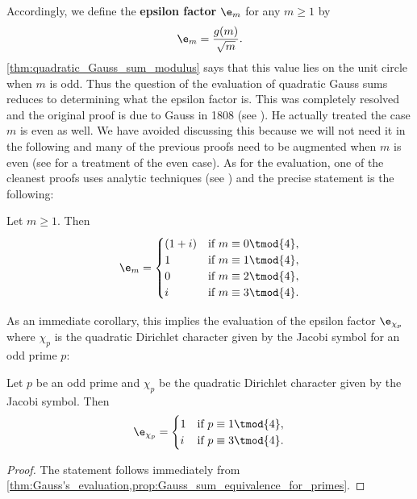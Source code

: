       Accordingly, we define the \textbf{epsilon factor} $\e_{m}$ for any $m \ge 1$ by
      \[
        \e_{m} = \frac{g(m)}{\sqrt{m}}.
      \]
      \cref{thm:quadratic_Gauss_sum_modulus} says that this value lies on the unit circle when $m$ is odd. Thus the question of the evaluation of quadratic Gauss sums reduces to determining what the epsilon factor is. This was completely resolved and the original proof is due to Gauss in 1808 (see \cite{Gauss1808summatio}). He actually treated the case $m$ is even as well. We have avoided discussing this because we will not need it in the following and many of the previous proofs need to be augmented when $m$ is even (see \cite{lang1994algebraic} for a treatment of the even case). As for the evaluation, one of the cleanest proofs uses analytic techniques (see \cite{lang1994algebraic}) and the precise statement is the following:

      \begin{theorem}\label{thm:Gauss's_evaluation}
        Let $m \ge 1$. Then
        \[
          \e_{m} = \begin{cases} (1+i) & \text{if $m \equiv 0 \tmod{4}$}, \\ 1 & \text{if $m \equiv 1 \tmod{4}$}, \\ 0 & \text{if $m \equiv 2 \tmod{4}$}, \\ i & \text{if $m \equiv 3 \tmod{4}$}. \end{cases}
        \]
      \end{theorem}

      As an immediate corollary, this implies the evaluation of the epsilon factor $\e_{\chi_{p}}$ where $\chi_{p}$ is the quadratic Dirichlet character given by the Jacobi symbol for an odd prime $p$:

      \begin{corollary}
        Let $p$ be an odd prime and $\chi_{p}$ be the quadratic Dirichlet character given by the Jacobi symbol. Then
        \[
          \e_{\chi_{p}} = \begin{cases} 1 & \text{if $p \equiv 1 \tmod{4}$}, \\ i & \text{if $p \equiv 3 \tmod{4}$}. \end{cases}
        \]
      \end{corollary}
      \begin{proof}
        The statement follows immediately from \cref{thm:Gauss's_evaluation,prop:Gauss_sum_equivalence_for_primes}.
      \end{proof}
